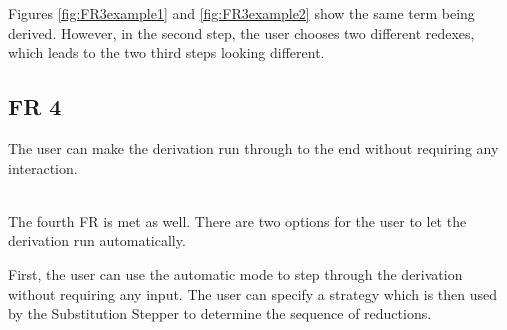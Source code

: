 Figures \ref*{fig:FR3example1} and \ref*{fig:FR3example2} show the same term being derived.
However, in the second step, the user chooses two different redexes,
which leads to the two third steps looking different.

\subsection{FR 4}
The user can make the derivation run through to the end without requiring any interaction.

\ \\
The fourth FR is met as well.
There are two options for the user to let the derivation run automatically.

First, the user can use the automatic mode to step through the derivation without requiring any input.
The user can specify a strategy which is then used by the Substitution Stepper to determine the sequence of reductions.

